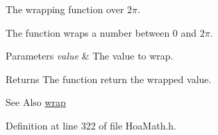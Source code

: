 The wrapping function over $2\pi$. 

The function wraps a number between 0 and $2\pi$.


\begin{DoxyParams}{Parameters}
{\em value} & The value to wrap. \\
\hline
\end{DoxyParams}
\begin{DoxyReturn}{Returns}
The function return the wrapped value.
\end{DoxyReturn}
\begin{DoxySeeAlso}{See Also}
\hyperlink{namespace_hoa_a5461cb6a0740423261895e0453a32ce3}{wrap} 
\end{DoxySeeAlso}


Definition at line 322 of file Hoa\-Math.\-h.

